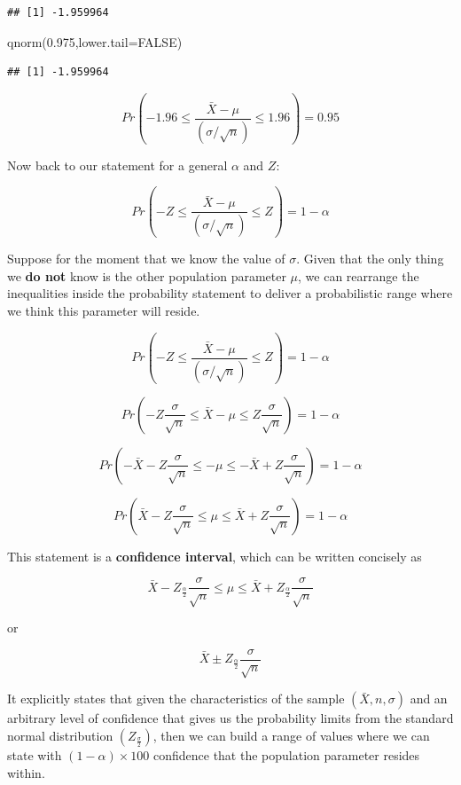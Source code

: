 \documentclass[
]{book}
\newenvironment{Shaded}{\begin{snugshade}}{\end{snugshade}}
\newcommand{\AttributeTok}[1]{\textcolor[rgb]{0.77,0.63,0.00}{#1}}
\newcommand{\ConstantTok}[1]{\textcolor[rgb]{0.00,0.00,0.00}{#1}}
\newcommand{\FloatTok}[1]{\textcolor[rgb]{0.00,0.00,0.81}{#1}}
\newcommand{\FunctionTok}[1]{\textcolor[rgb]{0.00,0.00,0.00}{#1}}
\newcommand{\NormalTok}[1]{#1}
\begin{document}
\begin{verbatim}
## [1] -1.959964
\end{verbatim}

\begin{Shaded}
\begin{Highlighting}[]
\FunctionTok{qnorm}\NormalTok{(}\FloatTok{0.975}\NormalTok{,}\AttributeTok{lower.tail=}\ConstantTok{FALSE}\NormalTok{)}
\end{Highlighting}
\end{Shaded}

\begin{verbatim}
## [1] -1.959964
\end{verbatim}

\[Pr\left(-1.96 \leq \frac{\bar{X}-\mu}{(\sigma/\sqrt{n})} \leq 1.96\right)=0.95\]

Now back to our statement for a general \(\alpha\) and \(Z\):

\[Pr\left(-Z \leq \frac{\bar{X}-\mu}{(\sigma/\sqrt{n})} \leq Z\right)=1-\alpha\]

Suppose for the moment that we know the value of \(\sigma\). Given that the only thing we \textbf{do not} know is the other population parameter \(\mu\), we can rearrange the inequalities inside the probability statement to deliver a probabilistic range where we think this parameter will reside.

\[Pr\left(-Z \leq \frac{\bar{X}-\mu}{(\sigma/\sqrt{n})} \leq Z\right)=1-\alpha\]

\[Pr\left(-Z\frac{\sigma}{\sqrt{n}} \leq \bar{X}-\mu \leq Z\frac{\sigma}{\sqrt{n}}\right)=1-\alpha\]

\[Pr\left(-\bar{X}-Z\frac{\sigma}{\sqrt{n}} \leq -\mu \leq -\bar{X}+Z\frac{\sigma}{\sqrt{n}}\right)=1-\alpha\]

\[Pr\left(\bar{X}-Z\frac{\sigma}{\sqrt{n}} \leq \mu \leq \bar{X}+Z\frac{\sigma}{\sqrt{n}}\right)=1-\alpha\]

This statement is a \textbf{confidence interval}, which can be written concisely as

\[\bar{X}-Z_{\frac{\alpha}{2}}\frac{\sigma}{\sqrt{n}} \leq \mu \leq \bar{X}+Z_{\frac{\alpha}{2}}\frac{\sigma}{\sqrt{n}}\]

or

\[\bar{X} \pm Z_{\frac{\alpha}{2}}\frac{\sigma}{\sqrt{n}}\]

It explicitly states that given the characteristics of the sample \((\bar{X},n,\sigma)\) and an arbitrary level of confidence that gives us the probability limits from the standard normal distribution \((Z_{\frac{\sigma}{2}})\), then we can build a range of values where we can state with \((1-\alpha) \times 100%
\) confidence that the population parameter resides within.
\end{document}
